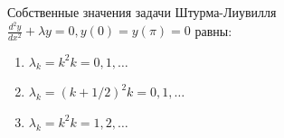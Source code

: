 Собственные значения задачи Штурма-Лиувилля  \(\frac{d^2y}{dx^2}+\lambda y =0, y\left(0\right)=y\left(\pi \right) =0\) равны:

\begin{enumerate}[label=\arabic*)]
    \item \(\lambda _k=k^2 k=0,1,\dots\)
    \item \(\lambda _k=(k+1/2)^2 k=0,1,\dots\)
    \item \(\lambda _k=k^2 k=1,2,\dots\)
\end{enumerate}

